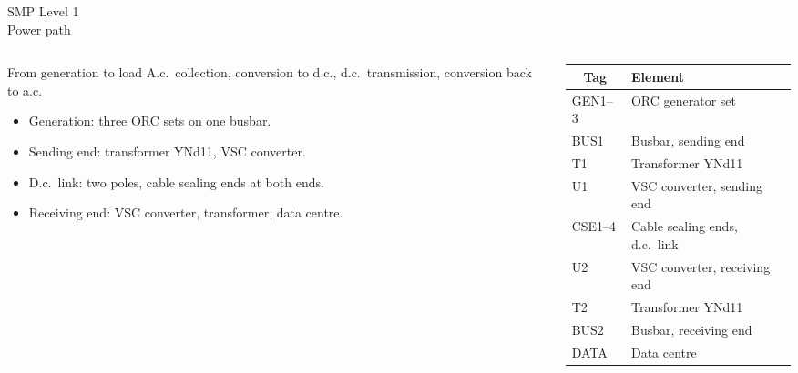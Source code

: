 \documentclass[aspectratio=169,11pt]{beamer}
\begin{document}
\begin{frame}{SMP Level 1\\Power path}
  \begin{columns}[T,onlytextwidth]
    \begin{column}{0.50\textwidth}
      \begin{block}{From generation to load}
        A.c.\ collection, conversion to d.c., d.c.\ transmission, conversion back to a.c.
      \end{block}
      \vspace{0.3em}
      \begin{itemize}
        \setlength{\itemsep}{0.4em}
        \item Generation: three ORC sets on one busbar.
        \item Sending end: transformer YNd11, VSC converter.
        \item D.c.\ link: two poles, cable sealing ends at both ends.
        \item Receiving end: VSC converter, transformer, data centre.
      \end{itemize}
    \end{column}
    \begin{column}{0.44\textwidth}
      \footnotesize
      \renewcommand{\arraystretch}{1.1}
      \begin{tabularx}{\linewidth}{@{}l >{\raggedright\arraybackslash}X@{}}
        \toprule
        \multicolumn{1}{c}{\textbf{Tag}} & \textbf{Element} \\
        \midrule
        GEN1--3 & ORC generator set \\
        BUS1    & Busbar, sending end \\
        T1      & Transformer YNd11 \\
        U1      & VSC converter, sending end \\
        CSE1--4 & Cable sealing ends, d.c.\ link \\
        U2      & VSC converter, receiving end \\
        T2      & Transformer YNd11 \\
        BUS2    & Busbar, receiving end \\
        DATA    & Data centre \\
        \bottomrule
      \end{tabularx}
    \end{column}
  \end{columns}
\end{frame}
\end{document}

